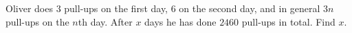 Oliver does $3$ pull-ups on the first day, $6$ on the second day, and in general $3n$ pull-ups on the $n$th day. After $x$ days he has done $2460$ pull-ups in total. Find $x$.
